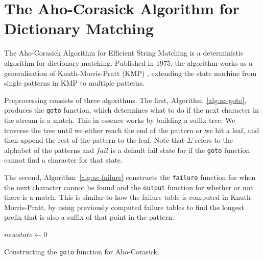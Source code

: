 \documentclass[ %
                    author={Dominic Joseph Moylett},
                    degree={MEng},
                     title={Dictionary Matching with Fingerprints},
                  subtitle={An Empirical Analysis},
                      type={research},
                      year={2015} ]{dissertation}
\begin{document}
\section{The Aho-Corasick Algorithm for Dictionary Matching}
\label{sec:aho-corasick}

The Aho-Corasick Algorithm for Efficient String Matching \cite{Aho:1975:ESM:360825.360855} is a deterministic algorithm for dictionary matching. Published in 1975, the algorithm works as a generalisation of Knuth-Morris-Pratt (KMP) \cite{kmp}, extending the state machine from single patterns in KMP to multiple patterns.

Preprocessing consists of three algorithms. The first, Algorithm~\ref{alg:ac-goto}, produces the \texttt{goto} function, which determines what to do if the next character in the stream is a match. This in essence works by building a suffix tree: We traverse the tree until we either reach the end of the pattern or we hit a leaf, and then append the rest of the pattern to the leaf. Note that $\Sigma$ refers to the alphabet of the patterns and $fail$ is a default fail state for if the \texttt{goto} function cannot find a character for that state.

The second, Algorithm~\ref{alg:ac-failure} constructs the \texttt{failure} function for when the next character cannot be found and the \texttt{output} function for whether or not there is a match. This is similar to how the failure table is computed in Knuth-Morris-Pratt, by using previously computed failure tables to find the longest prefix that is also a suffix of that point in the pattern.

\begin{algorithm}[t]
$newstate \gets 0$\\
\caption{Constructing the \texttt{goto} function for Aho-Corasick.}
\label{alg:ac-goto}
\end{algorithm}
\end{document}
